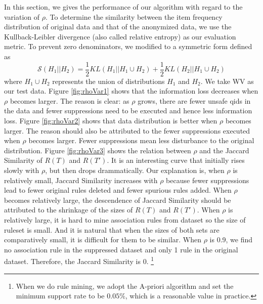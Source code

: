 In this section, we gives the performance of our
algorithm with regard
to the variation of $\rho$.
To determine the similarity between the item frequency distribution
of original data and that of the anonymized data,
we use the Kullback-Leibler divergence (also called relative entropy) as our evaluation metric.
To prevent zero denominators, we modified 
to a symmetric form \cite{Fisher:2008:DSF} defined as
\[\mathcal{S}(H_1||H_2)=\frac{1}{2}KL( H_1||H_1 \cup H_2)+\frac{1}{2} KL( H_2||H_1 \cup H_2)\]
where  $H_1 \cup H_2$ represents the union of distributions $H_1$ and $H_2$.
We take WV as our test data.
Figure \ref{fig:rhoVar1} shows that
the information loss decreases when $\rho$ becomes larger.
The reason is clear: as $\rho$ grows,
there are fewer unsafe qids in the data and
fewer suppressions need to be executed and hence less information
loss. Figure \ref{fig:rhoVar2} shows that data distribution
is better when $\rho$ becomes larger.
The reason should also be attributed to
the fewer suppressions executed when $\rho$ becomes larger. Fewer suppressions mean
less disturbance to the original distribution.
Figure \ref{fig:rhoVar3} shows the relation between $\rho$ and the Jaccard Similarity of $R(T)$ and $R(T')$. It is
an interesting curve that initially rises slowly with $\rho$,
but then drops drammatically. Our explanation is,
when $\rho$ is relatively small, Jaccard Similarity increases with $\rho$ because fewer suppressions lead to
fewer original rules deleted and fewer spurious rules added. When $\rho$ becomes relatively large,
the descendence of Jaccard Similarity should be attributed to the shrinkage of the sizes of $R(T)$ and $R(T')$.
When $\rho$ is relatively large, it is hard to mine association rules from dataset so the size of ruleset is small.
And it is natural that when the sizes of both sets are comparatively small, it is difficult for them to be similar.
When $\rho$ is 0.9, we find no association rule in the suppressed dataset and only 1 rule in the
original dataset. Therefore, the Jaccard Similarity is 0.
\footnote{When we do rule mining, we adopt the A-priori algorithm and set the minimum support rate to be
$0.05\%$, which is a reasonable value in practice.}


